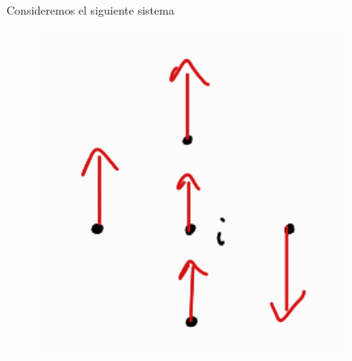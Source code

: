 \begin{ej}
Consideremos el siguiente sistema
	\begin{figure}[h!]
	\centering
	\includegraphics[scale=0.5]{fig/spin}
\end{figure}


\end{ej}
